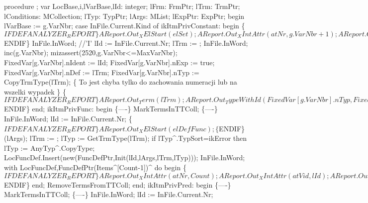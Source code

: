 procedure ;
var
   LocBase,i,lVarBase,lId: integer;
   lFrm: FrmPtr;
   lTrm: TrmPtr;
   lConditions: MCollection;
   lTyp: TypPtr;
   lArgs: MList;
   lExpPtr: ExpPtr;
begin
   lVarBase := g.VarNbr;
   case InFile.Current.Kind of
      ikItmPrivConstant:
         begin
            \{$IFDEF ANALYZER_REPORT\}
            AReport.Out_XElStart(elSet);
            AReport.Out_XIntAttr(atNr, g.VarNbr+1);
            AReport.Out_XAttrEnd;
            \{$ENDIF\}
            InFile.InWord; //'I'
            lId := InFile.Current.Nr;
            lTrm := ; InFile.InWord;
            inc(g.VarNbr); mizassert(2520,g.VarNbr<=MaxVarNbr);
            FixedVar[g.VarNbr].nIdent := lId;
            FixedVar[g.VarNbr].nExp := true;
            FixedVar[g.VarNbr].nDef := lTrm;
            FixedVar[g.VarNbr].nTyp := CopyTrmType(lTrm);
            \{ To jest chyba tylko do zachowania numeracji lub na wszelki wypadek \}
            \{$IFDEF ANALYZER_REPORT\}
            AReport.Out_Term(lTrm);
            AReport.Out_TypeWithId(FixedVar[g.VarNbr].nTyp,
                                   FixedVar[g.VarNbr].nIdent);
            AReport.Out_XElEnd(elSet);
            \{$ENDIF\}
         end;
      ikItmPrivFunc:
         begin
            \{----\}
            MarkTermsInTTColl;
            \{----\}
            InFile.InWord;
            lId := InFile.Current.Nr;
            \{$IFDEF ANALYZER_REPORT\}
            AReport.Out_XElStart(elDefFunc);
            \{$ENDIF\}
            (lArgs);
            lTrm := ;
            lTyp := GetTrmType(lTrm);
            if lTyp^.TypSort=ikError then
               lTyp := AnyTyp^.CopyType;
            LocFuncDef.Insert(new(FuncDefPtr,Init(lId,lArgs,lTrm,lTyp)));
            InFile.InWord;
            with LocFuncDef,FuncDefPtr(Items^[Count-1])^ do
            begin
               \{$IFDEF ANALYZER_REPORT\}
               AReport.Out_XIntAttr(atNr, Count);
               AReport.Out_XIntAttr(atVid, lId);
               AReport.Out_XAttrEnd;
               AReport.Out_ArgTypes(fPrimaries);
               AReport.Out_Term(fFuncDef);
               AReport.Out_Type(fFuncTyp);
               AReport.Out_XElEnd(elDefFunc);
               \{$ENDIF\}
            end;
            RemoveTermsFromTTColl;
         end;
      ikItmPrivPred:
         begin
            \{----\}
            MarkTermsInTTColl;
            \{----\}
            InFile.InWord;
            lId := InFile.Current.Nr;
